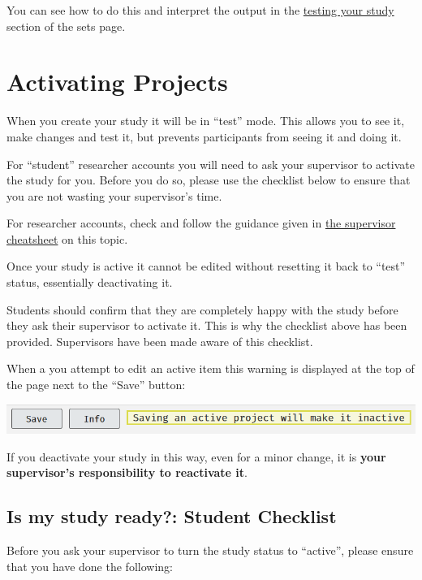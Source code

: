 \documentclass[]{book}
\begin{document}
You can see how to do this and interpret the output in the
\protect\hyperlink{sample_order}{testing your study} section of the sets
page.

\section{Activating Projects}\label{activating-projects}

When you create your study it will be in ``test'' mode. This allows you
to see it, make changes and test it, but prevents participants from
seeing it and doing it.

For ``student'' researcher accounts you will need to ask your supervisor
to activate the study for you. Before you do so, please use the
checklist below to ensure that you are not wasting your supervisor's
time.

For researcher accounts, check and follow the guidance given in
\protect\hyperlink{activating}{the supervisor cheatsheet} on this topic.

\begin{warning}
Once your study is active it cannot be edited without resetting it back
to ``test'' status, essentially deactivating it.

Students should confirm that they are completely happy with the study
before they ask their supervisor to activate it. This is why the
checklist above has been provided. Supervisors have been made aware of
this checklist.

When a you attempt to edit an active item this warning is displayed at
the top of the page next to the ``Save'' button:

\includegraphics{images/screenshots/editwarning.png}

If you deactivate your study in this way, even for a minor change, it is
\textbf{your supervisor's responsibility to reactivate it}.
\end{warning}

\subsection{Is my study ready?: Student
Checklist}\label{is-my-study-ready-student-checklist}

Before you ask your supervisor to turn the study status to ``active'',
please ensure that you have done the following:
\end{document}
